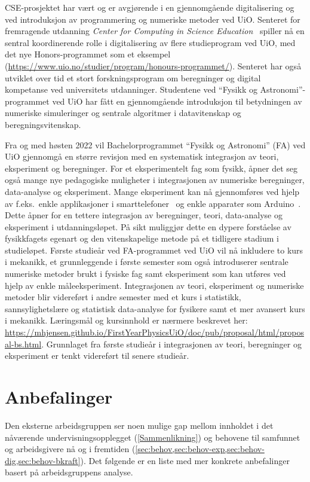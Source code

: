 \documentclass{article}
\begin{document}
CSE-prosjektet har vært og er avgjørende i en gjennomgående digitalisering og ved introduksjon av programmering og numeriske metoder ved UiO. Senteret for fremragende utdanning \emph{Center for Computing in Science Education}~\cite{UiOCCSE} spiller nå en sentral koordinerende rolle i digitalisering av flere studieprogram ved UiO, med det nye Honors-programmet som et eksempel (\url{https://www.uio.no/studier/program/honours-programmet/}). Senteret har også utviklet over tid et stort forskningsprogram om beregninger og digital kompetanse ved universitets utdanninger. Studentene ved ``Fysikk og Astronomi''-programmet ved UiO har fått en gjennomgående introduksjon til betydningen av numeriske simuleringer og sentrale algoritmer i datavitenskap og beregningsvitenskap.

Fra og med høsten 2022 vil Bachelorprogrammet ``Fysikk og Astronomi'' (FA) ved UiO gjennomgå en større revisjon med en systematisk integrasjon av teori, eksperiment og beregninger.
For et eksperimentelt fag som fysikk, åpner det seg også mange nye pedagogiske muligheter i integrasjonen av numeriske beregninger, data-analyse og eksperiment. Mange eksperiment kan nå gjennomføres ved hjelp av f.eks.~enkle applikasjoner i smarttelefoner~\cite{phyphox} og enkle apparater som Arduino~\cite{arduino}. Dette åpner for en tettere integrasjon av beregninger, teori, data-analyse og eksperiment i utdanningsløpet. På sikt muliggjør dette en dypere forståelse av fysikkfagets egenart og den vitenskapelige metode på et tidligere stadium i studieløpet.  Første studieår ved FA-programmet ved UiO vil nå inkludere to kurs i mekanikk, et grunnleggende i første semester som også introduserer sentrale numeriske metoder brukt i fysiske fag samt eksperiment som kan utføres ved hjelp av enkle måleeksperiment. Integrasjonen av teori, eksperiment og numeriske metoder blir videreført i andre semester med et kurs i statistikk, sannsylighetslære og statistisk data-analyse for fysikere samt et mer avansert kurs i mekanikk.
Læringsmål og kursinnhold er nærmere beskrevet her: \url{https://mhjensen.github.io/FirstYearPhysicsUiO/doc/pub/proposal/html/proposal-bs.html}.
Grunnlaget fra første studieår i integrasjonen av teori, beregninger og eksperiment er tenkt videreført til senere studieår.

\section{Anbefalinger}
Den eksterne arbeidsgruppen ser noen mulige gap mellom innholdet i det nåværende undervisningsopplegget (\cref{Sammenlikning}) og behovene til samfunnet og arbeidsgivere nå og i fremtiden (\cref{sec:behov,sec:behov-exp,sec:behov-dig,sec:behov-bkraft}). Det følgende er en liste med mer konkrete anbefalinger basert på arbeidsgruppens analyse.
\end{document}
